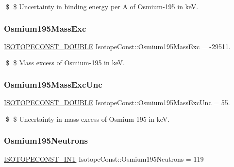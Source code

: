 \$ \$ Uncertainty in binding energy per A of Osmium-\/195 in keV. \mbox{\label{group___isotope_const-_osmium-_os195_ga6609e337c8afcc1ac24332a2ee3d1a0a}} 
\subsubsection{\texorpdfstring{Osmium195\+Mass\+Exc}{Osmium195MassExc}}
{\footnotesize\ttfamily \mbox{\hyperlink{group___isotope_const-_macros_ga8f45a7272ce02c0b4c65c44636ed719a}{I\+S\+O\+T\+O\+P\+E\+C\+O\+N\+S\+T\+\_\+\+D\+O\+U\+B\+LE}} Isotope\+Const\+::\+Osmium195\+Mass\+Exc = -\/29511.}

\$ \$ Mass excess of Osmium-\/195 in keV. \mbox{\label{group___isotope_const-_osmium-_os195_ga24bf3c1836602d9b430fee002454ba3e}} 
\subsubsection{\texorpdfstring{Osmium195\+Mass\+Exc\+Unc}{Osmium195MassExcUnc}}
{\footnotesize\ttfamily \mbox{\hyperlink{group___isotope_const-_macros_ga8f45a7272ce02c0b4c65c44636ed719a}{I\+S\+O\+T\+O\+P\+E\+C\+O\+N\+S\+T\+\_\+\+D\+O\+U\+B\+LE}} Isotope\+Const\+::\+Osmium195\+Mass\+Exc\+Unc = 55.}

\$ \$ Uncertainty in mass excess of Osmium-\/195 in keV. \mbox{\label{group___isotope_const-_osmium-_os195_gac2560464c527a5f8159ce029370db584}} 
\subsubsection{\texorpdfstring{Osmium195\+Neutrons}{Osmium195Neutrons}}
{\footnotesize\ttfamily \mbox{\hyperlink{group___isotope_const-_macros_ga5f18360b3e99483a35c32d789e62621c}{I\+S\+O\+T\+O\+P\+E\+C\+O\+N\+S\+T\+\_\+\+I\+NT}} Isotope\+Const\+::\+Osmium195\+Neutrons = 119}


